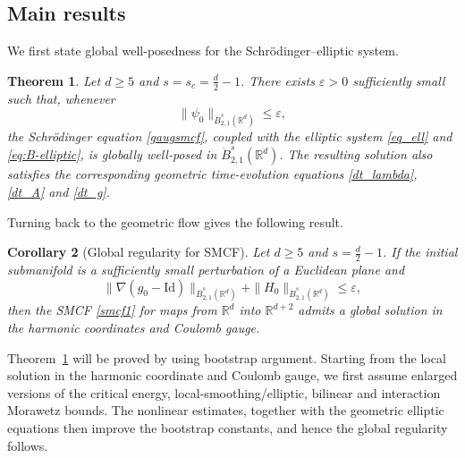 \documentclass[11pt,letterpaper,reqno]{amsart}
\numberwithin{equation}{section}
\newtheorem{theorem}{Theorem}[section]
\newtheorem{corollary}[theorem]{Corollary}
\newcommand{\Id}{\mathrm{Id}}
\newcommand{\R}{\mathbb R}
\theoremstyle{definition}
\theoremstyle{remark}
\begin{document}
\subsection{Main results}

We first state global well-posedness for the Schr\"odinger--elliptic
system.

\begin{theorem}
\label{thm1}
Let $d\ge5$ and $s=s_c=\frac d2-1$.  There exists $\varepsilon>0$ sufficiently small such that, whenever
\begin{equation}\label{inid}
 \|\psi_0\|_{\dot B^s_{2,1}(\R^d)}\le\varepsilon,
\end{equation}
the Schr\"odinger equation \eqref{gaugsmcf}, coupled with the elliptic system  \eqref{eq_ell} and \eqref{eq:B-elliptic}, is globally well-posed in
$\dot B^s_{2,1}(\R^d)$.  The resulting solution also satisfies the corresponding
geometric time-evolution equations \eqref{dt_lambda}, \eqref{dt_A} and \eqref{dt_g}.
\end{theorem}

Turning back to the geometric flow gives the following result.

\begin{corollary}[Global regularity for SMCF]
\label{cor1}
Let $d\ge5$ and $s=\frac d2-1$.  If the initial submanifold is a sufficiently small
perturbation of a Euclidean plane and
\[
 \|\nabla(g_0-\Id)\|_{\dot B^s_{2,1}(\R^d)}
 +\|H_0\|_{\dot B^s_{2,1}(\R^d)}
 \le\varepsilon,
\]
then the SMCF \eqref{smcf1} for maps from $\R^d$ into $\R^{d+2}$ admits a
global solution in the harmonic coordinates and Coulomb gauge.
\end{corollary}



  

 Theorem~\ref{thm1} will be proved by using bootstrap argument.  Starting
from the local solution in the harmonic coordinate and Coulomb gauge, we first assume enlarged versions of the
critical energy, local-smoothing/elliptic, bilinear and interaction Morawetz bounds.
The nonlinear estimates, together with the geometric elliptic equations then improve
the bootstrap constants, and hence the global regularity follows.
\end{document}
